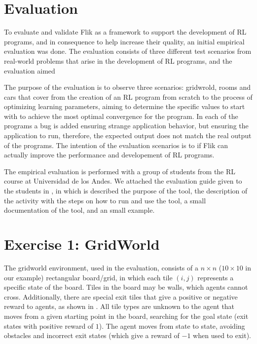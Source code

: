 
\section{Evaluation}
\label{sec:evaluation}

To evaluate and validate \ac{Flik} as a framework to support the development 
of \ac{RL} programs, and in consequence to help increase their quality, 
an initial empirical evaluation was done. The evaluation consists of three different test scenarios 
from real-world problems that arise in the development of \ac{RL} programs, and the evaluation aimed

The purpose of the evaluation is to observe three scenarios: gridwrold, rooms and cars that cover from 
the creation of an \ac{RL} program from scratch to the process of optimizing 
learning parameters, aiming to determine the specific values to start with 
to achieve the most optimal convergence for the program. In each of the programs a bug 
is added ensuring strange application behavior, but ensuring the application to run, 
therefore, the expected output does not match the real output of the programs. The intention of 
the evaluation scenarios is to if \ac{Flik} can actually improve the performance and developement of \ac{RL}
programs.

The empirical evaluation is performed with a group of students from the \ac{RL} course at Universidad de 
los Andes. We attached the evaluation guide given to the students in , in which 
is described the purpose of the tool, the description of the activity with the steps on how to run and 
use the tool, a small documentation of the tool, and an small example.

\section{Exercise 1: GridWorld}
\label{sec:grid-eval}

The gridworld environment, used in the evaluation, consists of a $n\times n$ ($10\times 10$ in our example) rectangular 
board/grid, in which each tile $(i,j)$ represents a specific state of the board. Tiles in the board may be 
walls, which agents cannot cross. Additionally, there are special exit 
tiles that give a positive or negative reward to agents, as shown in . All tile types 
are unknown to the agent that moves from a given starting point in the board, searching for the goal 
state (\ie exit states with positive reward of $1$). The agent moves from state to state, avoiding 
obstacles and incorrect exit states (which give a reward of $-1$ when used to exit). 

